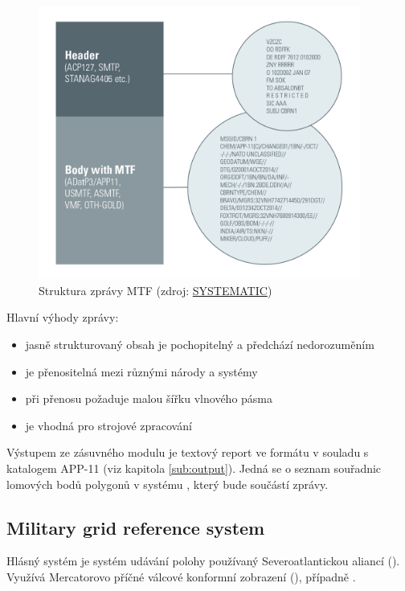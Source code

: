 \begin{figure}[H]
    \centering
      \includegraphics[width=300pt]{./pictures/Military-Messaging-white-borders-988px.png}
      \caption[Struktura zprávy MTF]{Struktura zprávy MTF
      (zdroj: \href{https://systematic.com/defence/products/a/military-messaging/app-11-and-adatp-3/}{SYSTEMATIC})}
      \label{fig:systematic}
  \end{figure}
  
Hlavní výhody  zprávy:

\begin{itemize}
	\item{jasně strukturovaný obsah je pochopitelný a předchází nedorozuměním}
	\item{je přenositelná mezi různými národy a systémy}
	\item{při přenosu požaduje malou šířku vlnového pásma}
	\item{je vhodná pro strojové zpracování}
\end{itemize}

Výstupem ze zásuvného modulu je textový report ve formátu v souladu s
katalogem APP-11 (viz kapitola \ref{sub:output}). Jedná se o seznam 
souřadnic lomových bodů polygonů v systému , který bude 
součástí  zprávy.

\subsection{Military grid reference system}

Hlásný systém  je systém udávání polohy používaný
Severoatlantickou aliancí (). Využívá Mercatorovo příčné
válcové konformní zobrazení (), případně .

